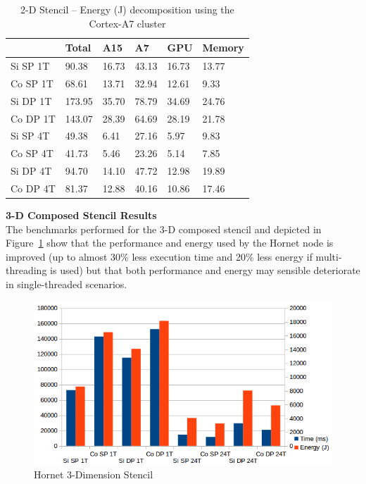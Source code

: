 \documentclass{acm_proc_article-sp}
\begin{document}
\begin{table}[ht]
  \begin{center}
    \begin{tabular}{| l | l | l | l | l | l |}
      \hline
      & Total & A15 & A7 & GPU & Memory \\ \hline
      Si SP 1T & 90.38&	 16.73&	43.13&	16.73&	13.77 \\ \hline
      Co SP 1T & 68.61&	 13.71&	32.94&	12.61&	9.33 \\ \hline
      Si DP 1T & 173.95& 35.70&	78.79&	34.69&	24.76 \\ \hline
      Co DP 1T & 143.07& 28.39&	64.69&	28.19&	21.78 \\ \hline
      Si SP 4T & 49.38&	 6.41&	27.16&	5.97&	9.83 \\ \hline
      Co SP 4T & 41.73&	 5.46&	23.26&	5.14&	7.85 \\ \hline
      Si DP 4T & 94.70&	 14.10&	47.72&	12.98&	19.89 \\ \hline
      Co DP 4T & 81.37&	 12.88&	40.16&	10.86&	17.46 \\ \hline
    \end{tabular}
    \caption{2-D Stencil -- Energy (J) decomposition using the Cortex-A7 cluster}
    \label{tbl:energy-A7-2D}
  \end{center}
\end{table}



\noindent \textbf{3-D Composed Stencil Results} \\
The benchmarks performed for the 3-D composed stencil and depicted in Figure~\ref{pic:hornet-3d} show that the performance and energy used by the Hornet node is improved (up to almost 30\% less execution time and 20\% less energy if multi-threading is used) but that both performance and energy may sensible deteriorate in single-threaded scenarios.
\begin{figure}[ht!]
  \centering
  \includegraphics[scale=0.5]{results/Hornet-3D}
  \caption{Hornet 3-Dimension Stencil}
  \label{pic:hornet-3d}
\end{figure}
\end{document}
